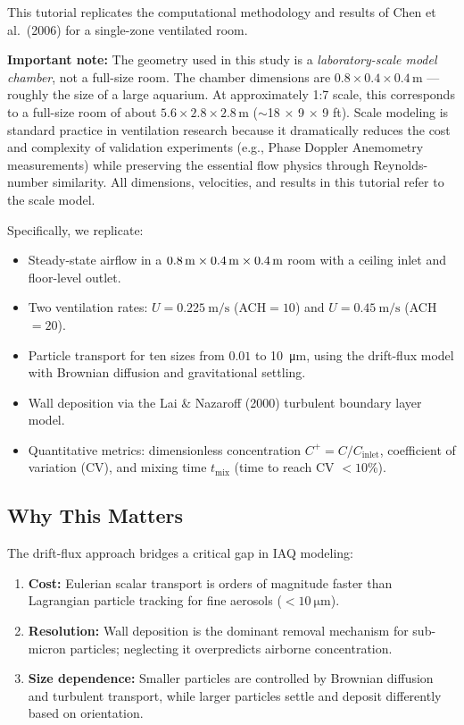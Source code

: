 \documentclass[12pt]{article}
\begin{document}
This tutorial replicates the computational methodology and results of Chen et al.~(2006) for a single-zone ventilated room.

\textbf{Important note:} The geometry used in this study is a \emph{laboratory-scale model chamber}, not a full-size room. The chamber dimensions are $0.8 \times 0.4 \times 0.4\,$m --- roughly the size of a large aquarium. At approximately 1:7 scale, this corresponds to a full-size room of about $5.6 \times 2.8 \times 2.8\,$m ($\sim$18 $\times$ 9 $\times$ 9 ft). Scale modeling is standard practice in ventilation research because it dramatically reduces the cost and complexity of validation experiments (e.g., Phase Doppler Anemometry measurements) while preserving the essential flow physics through Reynolds-number similarity. All dimensions, velocities, and results in this tutorial refer to the scale model.

Specifically, we replicate:

\begin{itemize}
    \item Steady-state airflow in a $0.8\,{\rm m} \times 0.4\,{\rm m} \times 0.4\,{\rm m}$ room with a ceiling inlet and floor-level outlet.
    \item Two ventilation rates: $U = \SI{0.225}{\meter\per\second}$ (ACH$=10$) and $U = \SI{0.45}{\meter\per\second}$ (ACH$=20$).
    \item Particle transport for ten sizes from $0.01$ to \SI{10}{\micro\meter}, using the drift-flux model with Brownian diffusion and gravitational settling.
    \item Wall deposition via the Lai \& Nazaroff (2000) turbulent boundary layer model.
    \item Quantitative metrics: dimensionless concentration $C^+ = C / C_\text{inlet}$, coefficient of variation (CV), and mixing time $t_\text{mix}$ (time to reach CV $<10$\%).
\end{itemize}

\subsection{Why This Matters}

The drift-flux approach bridges a critical gap in IAQ modeling:
\begin{enumerate}
    \item \textbf{Cost:} Eulerian scalar transport is orders of magnitude faster than Lagrangian particle tracking for fine aerosols ($<\SI{10}{\micro\meter}$).
    \item \textbf{Resolution:} Wall deposition is the dominant removal mechanism for sub-micron particles; neglecting it overpredicts airborne concentration.
    \item \textbf{Size dependence:} Smaller particles are controlled by Brownian diffusion and turbulent transport, while larger particles settle and deposit differently based on orientation.
\end{enumerate}
\end{document}
